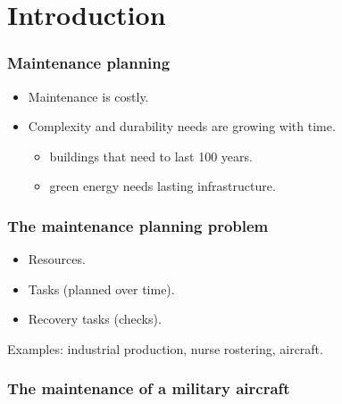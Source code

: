 \section{Introduction}

\begin{frame}
\frametitle{\textbf{Maintenance planning}}

  \begin{itemize}[<+->]
  \item
    Maintenance is costly.
  \item
    Complexity and durability needs are growing with time.

    \begin{itemize}[<+->]
    
    \item
      buildings that need to last 100 years.
    \item
      green energy needs lasting infrastructure.
    \end{itemize}
  \end{itemize}
\end{frame}

\begin{frame}
\frametitle{\textbf{The maintenance planning problem}}

  \pause

  \begin{itemize}[<+->]

  \item Resources.
  \item Tasks (planned over time).
  \item Recovery tasks (checks).
  \end{itemize}
  
  \pause
  Examples: industrial production, nurse rostering, aircraft.
\end{frame}

\begin{frame}
\frametitle{\textbf{The maintenance of a military aircraft}}
  \begin{tikzpicture}
    
  \end{tikzpicture}
\end{frame}

